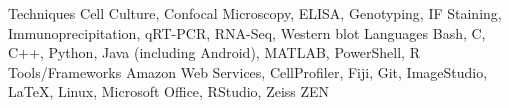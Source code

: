 \begin{cvskills}
  \cvskill
    {Techniques} %
    {Cell Culture, Confocal Microscopy, ELISA, Genotyping, IF Staining, Immunoprecipitation, qRT-PCR, RNA-Seq, Western blot} %
  \cvskill
    {Languages} %
    {Bash, C, C++, Python, Java (including Android), MATLAB, PowerShell, R} %
  \cvskill
    {Tools/Frameworks} %
    {Amazon Web Services, CellProfiler, Fiji, Git, ImageStudio, LaTeX, Linux, Microsoft Office, RStudio, Zeiss ZEN} %
\end{cvskills}
